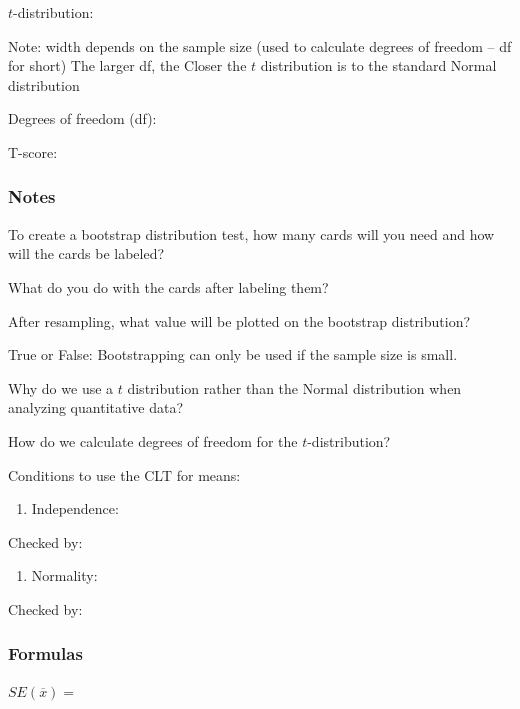 \documentclass[
]{report}
\providecommand{\tightlist}{%
  \setlength{\itemsep}{0pt}\setlength{\parskip}{0pt}}
\newcommand{\rgs}{\vspace{12pt}} %
\newcommand{\rgi}{\hspace{24pt}}  %
\begin{document}
\(t\)-distribution:
\rgs 

\rgi Note: width depends on the sample size (used to calculate degrees of freedom -- df for short)
\rgi The larger df, the Closer the \(t\) distribution is to the standard Normal distribution

Degrees of freedom (df):
\rgs 

T-score:
\rgs 

\hypertarget{notes-24}{%
\subsubsection*{Notes}\label{notes-24}}

To create a bootstrap distribution test, how many cards will you need and how will the cards be labeled?
\rgs 

What do you do with the cards after labeling them?
\rgs 

After resampling, what value will be plotted on the bootstrap distribution?
\rgs 

True or False: Bootstrapping can only be used if the sample size is small.
\rgs 

Why do we use a \(t\) distribution rather than the Normal distribution when analyzing quantitative data?
\rgs 

How do we calculate degrees of freedom for the \(t\)-distribution?
\rgs 

Conditions to use the CLT for means:

\begin{enumerate}
\def\labelenumi{\arabic{enumi}.}
\tightlist
\item
  Independence:
  \rgs 
\end{enumerate}

\rgi Checked by:
\rgs 

\begin{enumerate}
\def\labelenumi{\arabic{enumi}.}
\setcounter{enumi}{1}
\tightlist
\item
  Normality:
  \rgs 
\end{enumerate}

\rgi Checked by:
\rgs 

\hypertarget{formulas-8}{%
\subsubsection*{Formulas}\label{formulas-8}}

\(SE(\overline{x})=\)
\rgs 
\end{document}
